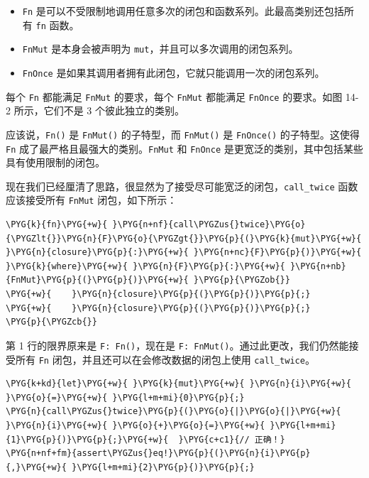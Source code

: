 \begin{itemize}
\item \texttt{Fn} 是可以不受限制地调用任意多次的闭包和函数系列。此最高类别还包括所有 \texttt{fn} 函数。
\item \texttt{FnMut} 是本身会被声明为 \texttt{mut}，并且可以多次调用的闭包系列。
\item \texttt{FnOnce} 是如果其调用者拥有此闭包，它就只能调用一次的闭包系列。
\end{itemize}

每个 \texttt{Fn} 都能满足 \texttt{FnMut} 的要求，每个 \texttt{FnMut} 都能满足 \texttt{FnOnce} 的要求。如图 14-2 所示，它们不是 3 个彼此独立的类别。


应该说，\texttt{Fn()} 是 \texttt{FnMut()} 的子特型，而 \texttt{FnMut()} 是 \texttt{FnOnce()} 的子特型。这使得 \texttt{Fn} 成了最严格且最强大的类别。\texttt{FnMut} 和 \texttt{FnOnce} 是更宽泛的类别，其中包括某些具有使用限制的闭包。

现在我们已经厘清了思路，很显然为了接受尽可能宽泛的闭包，\texttt{call\_twice} 函数应该接受所有 \texttt{FnMut} 闭包，如下所示：

\begin{Verbatim}[commandchars=\\\{\},breaklines=true,breakanywhere=true,fontsize=\codefont,xleftmargin=17bp]
\PYG{k}{fn}\PYG{+w}{ }\PYG{n+nf}{call\PYGZus{}twice}\PYG{o}{\PYGZlt{}}\PYG{n}{F}\PYG{o}{\PYGZgt{}}\PYG{p}{(}\PYG{k}{mut}\PYG{+w}{ }\PYG{n}{closure}\PYG{p}{:}\PYG{+w}{ }\PYG{n+nc}{F}\PYG{p}{)}\PYG{+w}{ }\PYG{k}{where}\PYG{+w}{ }\PYG{n}{F}\PYG{p}{:}\PYG{+w}{ }\PYG{n+nb}{FnMut}\PYG{p}{(}\PYG{p}{)}\PYG{+w}{ }\PYG{p}{\PYGZob{}}
\PYG{+w}{    }\PYG{n}{closure}\PYG{p}{(}\PYG{p}{)}\PYG{p}{;}
\PYG{+w}{    }\PYG{n}{closure}\PYG{p}{(}\PYG{p}{)}\PYG{p}{;}
\PYG{p}{\PYGZcb{}}
\end{Verbatim}

第 1 行的限界原来是 \texttt{F: Fn()}，现在是 \texttt{F: FnMut()}。通过此更改，我们仍然能接受所有 \texttt{Fn} 闭包，并且还可以在会修改数据的闭包上使用 \texttt{call\_twice}。

\begin{Verbatim}[commandchars=\\\{\},breaklines=true,breakanywhere=true,fontsize=\codefont,xleftmargin=17bp]
\PYG{k+kd}{let}\PYG{+w}{ }\PYG{k}{mut}\PYG{+w}{ }\PYG{n}{i}\PYG{+w}{ }\PYG{o}{=}\PYG{+w}{ }\PYG{l+m+mi}{0}\PYG{p}{;}
\PYG{n}{call\PYGZus{}twice}\PYG{p}{(}\PYG{o}{|}\PYG{o}{|}\PYG{+w}{ }\PYG{n}{i}\PYG{+w}{ }\PYG{o}{+}\PYG{o}{=}\PYG{+w}{ }\PYG{l+m+mi}{1}\PYG{p}{)}\PYG{p}{;}\PYG{+w}{  }\PYG{c+c1}{// 正确！}
\PYG{n+nf+fm}{assert\PYGZus{}eq!}\PYG{p}{(}\PYG{n}{i}\PYG{p}{,}\PYG{+w}{ }\PYG{l+m+mi}{2}\PYG{p}{)}\PYG{p}{;}
\end{Verbatim}


